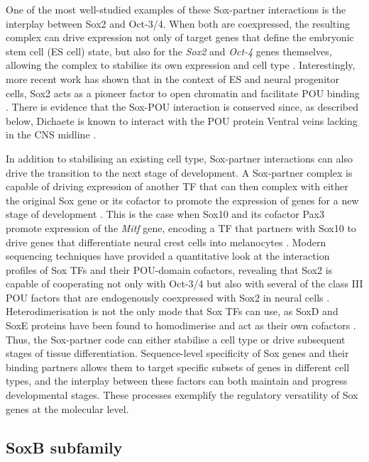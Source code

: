\documentclass[withindex,glossary]{cam-thesis}
\begin{document}
One of the most well-studied examples of these Sox-partner interactions
is the interplay between Sox2 and Oct-3/4. When both are coexpressed,
the resulting complex can drive expression not only of target genes that
define the embryonic stem cell (\gls{ES cell}) state, but also for the \emph{Sox2}
and \emph{Oct-4} genes themselves, allowing the complex to stabilise its
own expression and cell type . Interestingly, more recent work has shown that in the context of
ES and neural progenitor cells, Sox2 acts as a pioneer factor to open
chromatin and facilitate POU binding . There is
evidence that the Sox-POU interaction is conserved since, as described
below, Dichaete is known to interact with the POU protein Ventral veins
lacking in the CNS midline .

In addition to stabilising an existing cell type, Sox-partner
interactions can also drive the transition to the next stage of
development. A Sox-partner complex is capable of driving expression of
another TF that can then complex with either the original Sox gene or
its cofactor to promote the expression of genes for a new stage of
development . This is the case when Sox10 and
its cofactor Pax3 promote expression of the \emph{Mitf} gene, encoding a
TF that partners with Sox10 to drive genes that differentiate neural
crest cells into melanocytes . Modern sequencing techniques have provided a quantitative look at
the interaction profiles of Sox TFs and their POU-domain cofactors,
revealing that Sox2 is capable of cooperating not only with Oct-3/4 but
also with several of the class III POU factors that are endogenously
coexpressed with Sox2 in neural cells .
Heterodimerisation is not the only mode that Sox TFs can use, as SoxD
and SoxE proteins have been found to homodimerise and act as their own
cofactors . Thus, the Sox-partner code can either
stabilise a cell type or drive subsequent stages of tissue
differentiation. Sequence-level specificity of Sox genes and their
binding partners allows them to target specific subsets of genes in
different cell types, and the interplay between these factors can both
maintain and progress developmental stages. These processes exemplify
the regulatory versatility of Sox genes at the molecular level.

\subsection{SoxB subfamily}
\end{document}
